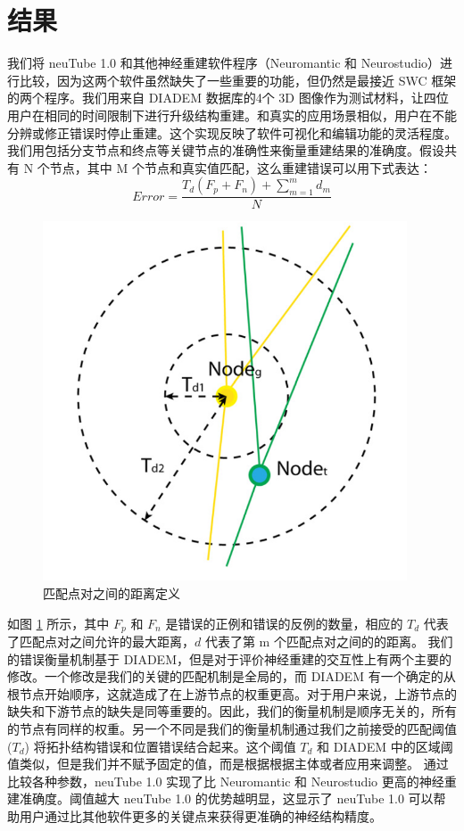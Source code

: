 {\section{结果}
我们将 neuTube 1.0 和其他神经重建软件程序（Neuromantic 和 Neurostudio）进行比较，因为这两个软件虽然缺失了一些重要的功能，但仍然是最接近 SWC 框架的两个程序。我们用来自 DIADEM 数据库的4个 3D 图像作为测试材料，让四位用户在相同的时间限制下进行升级结构重建。和真实的应用场景相似，用户在不能分辨或修正错误时停止重建。这个实现反映了软件可视化和编辑功能的灵活程度。我们用包括分支节点和终点等关键节点的准确性来衡量重建结果的准确度。假设共有 N 个节点，其中 M 个节点和真实值匹配，这么重建错误可以用下式表达：
$$Error = \frac{T_d(F_p+F_n) + \sum_{m=1}^{m} d_m}{N}$$

\begin{figure}
\centering
\includegraphics[width=108mm]{images/12}
\caption{匹配点对之间的距离定义}
\label{fan12}
\end{figure}

如图 \ref{fan12} 所示，其中 $F_p$ 和 $F_n$ 是错误的正例和错误的反例的数量，相应的 $T_d$ 代表了匹配点对之间允许的最大距离，$d$ 代表了第 m 个匹配点对之间的的距离。
我们的错误衡量机制基于 DIADEM，但是对于评价神经重建的交互性上有两个主要的修改。一个修改是我们的关键的匹配机制是全局的，而 DIADEM 有一个确定的从根节点开始顺序，这就造成了在上游节点的权重更高。对于用户来说，上游节点的缺失和下游节点的缺失是同等重要的。因此，我们的衡量机制是顺序无关的，所有的节点有同样的权重。另一个不同是我们的衡量机制通过我们之前接受的匹配阈值 ($T_d$) 将拓扑结构错误和位置错误结合起来。这个阈值 $T_d$ 和 DIADEM 中的区域阈值类似，但是我们并不赋予固定的值，而是根据根据主体或者应用来调整。
通过比较各种参数，neuTube 1.0 实现了比 Neuromantic 和 Neurostudio 更高的神经重建准确度。阈值越大 neuTube 1.0 的优势越明显，这显示了 neuTube 1.0 可以帮助用户通过比其他软件更多的关键点来获得更准确的神经结构精度。
}



